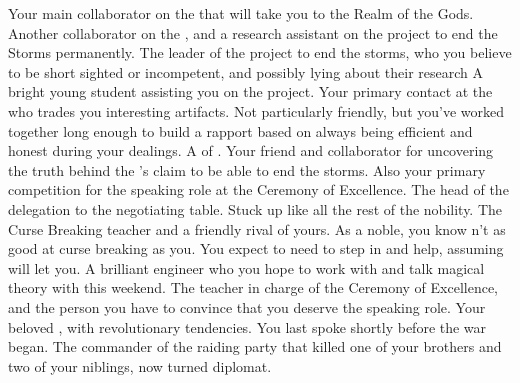 \documentclass[char]{GL2020}
\begin{document}
\begin{contacts}
    \contact{\cFlowPriest{}} Your main collaborator on the \iBeansNB{} that will take you to the Realm of the Gods.
    \contact{\cAssistantScientist{}} Another collaborator on the \iBeansNB{}, and a research assistant on the \pTech{} project to end the Storms permanently.
    \contact{\cHeadScientist{}} The leader of the project to end the storms, who you believe to be short sighted or incompetent, and possibly lying about their research
    \contact{\cAmbition{}} A bright young student assisting you on the \iBeansNB{} project. 
    \contact{\cChupSecond{}} Your primary contact at the \pSc{} who trades you interesting artifacts. Not particularly friendly, but you've worked together long enough to build a rapport based on \cChupSecond{\them} always being efficient and honest during your dealings.
    \contact{\cHedonist{}} A \cHedonist{\cleric} of \cFarmGod{}. Your friend and collaborator for uncovering the truth behind the \pTech{}'s claim to be able to end the storms. Also your primary competition for the speaking role at the Ceremony of Excellence.
    \contact{\cEvil{}} The head of the \pFarm{} delegation to the negotiating table. Stuck up like all the rest of the nobility.
    \contact{\cPrince{}} The Curse Breaking teacher and a friendly rival of yours. As a noble, you know \cPrince{\they} \cPrince{\are}n't as good at curse breaking as you. You expect to need to step in and help, assuming \cPrince{} will let you.
    \contact{\cBunker{}} A brilliant engineer who you hope to work with and talk magical theory with this weekend.
    \contact{\cMusic{}} The teacher in charge of the Ceremony of Excellence, and the person you have to convince that you deserve the speaking role.
    \contact{\cChupLeader{}} Your beloved \cChupLeader{\nibling}, with revolutionary tendencies. You last spoke shortly before the war began.
    \contact{\cJuniorStatesman{}} The commander of the \pShippie{} raiding party that killed one of your brothers and two of your niblings, now turned diplomat. 
\end{contacts}
\end{document}
